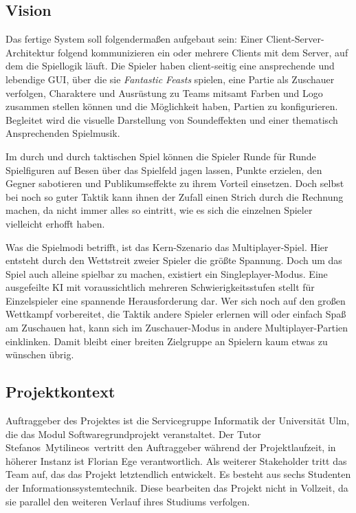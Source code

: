 \subsection{Vision}
Das fertige System soll folgendermaßen aufgebaut sein: Einer Client-Server-Architektur folgend kommunizieren ein oder mehrere Clients mit dem Server, auf dem die Spiellogik läuft. Die Spieler haben client-seitig eine ansprechende und lebendige GUI, über die sie \textit{Fantastic Feasts} spielen, eine Partie als Zuschauer verfolgen, Charaktere und Ausrüstung zu Teams mitsamt Farben und Logo zusammen stellen können und die Möglichkeit haben, Partien zu konfigurieren. Begleitet wird die visuelle Darstellung von Soundeffekten und einer thematisch Ansprechenden Spielmusik.

Im durch und durch taktischen Spiel können die Spieler Runde für Runde Spielfiguren auf Besen über das Spielfeld jagen lassen, Punkte erzielen, den Gegner sabotieren und Publikumseffekte zu ihrem Vorteil einsetzen. Doch selbst bei noch so guter Taktik kann ihnen der Zufall einen Strich durch die Rechnung machen, da nicht immer alles so eintritt, wie es sich die einzelnen Spieler vielleicht erhofft haben.

Was die Spielmodi betrifft, ist das Kern-Szenario das Multiplayer-Spiel. Hier entsteht durch den Wettstreit zweier Spieler die größte Spannung. Doch um das Spiel auch alleine spielbar zu machen, existiert ein Singleplayer-Modus. Eine ausgefeilte KI mit voraussichtlich mehreren Schwierigkeitsstufen stellt für Einzelspieler eine spannende Herausforderung dar. Wer sich noch auf den großen Wettkampf vorbereitet, die Taktik andere Spieler erlernen will oder einfach Spaß am Zuschauen hat, kann sich im Zuschauer-Modus in andere Multiplayer-Partien einklinken. Damit bleibt einer breiten Zielgruppe an Spielern kaum etwas zu wünschen übrig.

\subsection{Projektkontext}
Auftraggeber des Projektes ist die Servicegruppe Informatik der Universität Ulm, die das Modul Softwaregrundprojekt veranstaltet. Der Tutor Stefanos Mytilineos vertritt den Auftraggeber während der Projektlaufzeit, in höherer Instanz ist Florian Ege verantwortlich. Als weiterer Stakeholder tritt das Team auf, das das Projekt letztendlich entwickelt. Es besteht aus sechs Studenten der Informationssystemtechnik. Diese bearbeiten das Projekt nicht in Vollzeit, da sie parallel den weiteren Verlauf ihres Studiums verfolgen. 

